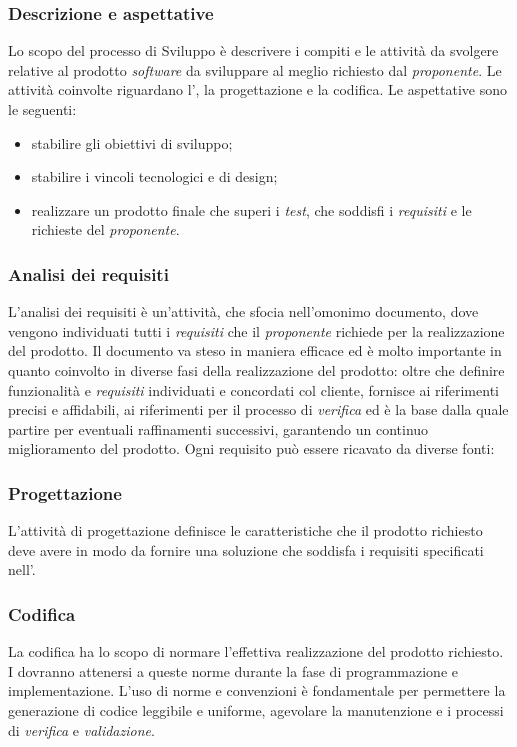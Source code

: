 \subsubsection{Descrizione e aspettative}
Lo scopo del processo di Sviluppo è descrivere i compiti e le attività da svolgere relative al prodotto \emph{software} da sviluppare al meglio richiesto dal \emph{proponente}.
Le attività coinvolte riguardano l'\AdR{}, la progettazione e la codifica.
Le aspettative sono le seguenti:
\begin{itemize}
	\item stabilire gli obiettivi di sviluppo;
	\item stabilire i vincoli tecnologici e di design;
	\item realizzare un prodotto finale che superi i \emph{test}, che soddisfi i \emph{requisiti} e le richieste del \emph{proponente}. 
\end{itemize}

\subsubsection{Analisi dei requisiti}
L'analisi dei requisiti è un'attività, che sfocia nell'omonimo documento, dove vengono individuati tutti i \emph{requisiti} che il \emph{proponente} richiede per la realizzazione del prodotto.\newline{}
Il documento \AdR{} va steso in maniera efficace ed è molto importante in quanto coinvolto in diverse fasi della realizzazione del prodotto: oltre che definire funzionalità e \emph{requisiti} individuati e concordati col cliente, fornisce ai \progrs{} riferimenti precisi e affidabili, ai \verf{} riferimenti per il processo di \emph{verifica} ed è la base dalla quale partire per eventuali raffinamenti successivi, garantendo un continuo miglioramento del prodotto. 
Ogni requisito può essere ricavato da diverse fonti: %


\subsubsection{Progettazione} %
L'attività di progettazione definisce le caratteristiche che il prodotto richiesto deve avere in modo da fornire una soluzione che soddisfa i requisiti specificati nell'\AdR{}.


\subsubsection{Codifica} %
La codifica ha lo scopo di normare l'effettiva realizzazione del prodotto richiesto. I \progrs{} dovranno attenersi a queste norme durante la fase di programmazione e implementazione. L'uso di norme e convenzioni è fondamentale per permettere la generazione di codice leggibile e uniforme, agevolare la manutenzione e i processi di \emph{verifica} e \emph{validazione}.

